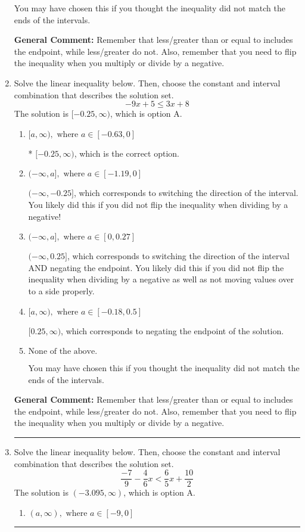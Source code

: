 \documentclass{extbook}[14pt]
\newcommand{\litem}[1]{\item #1

\rule{\textwidth}{0.4pt}}
\begin{document}
\begin{enumerate}
{\begin{enumerate}[label=\Alph*.]
You may have chosen this if you thought the inequality did not match the ends of the intervals.
\end{enumerate}

\textbf{General Comment:} Remember that less/greater than or equal to includes the endpoint, while less/greater do not. Also, remember that you need to flip the inequality when you multiply or divide by a negative.
}
\litem{
Solve the linear inequality below. Then, choose the constant and interval combination that describes the solution set.
\[ -9x + 5 \leq 3x + 8 \]The solution is \( [-0.25, \infty) \), which is option A.\begin{enumerate}[label=\Alph*.]
\item \( [a, \infty), \text{ where } a \in [-0.63, 0] \)

* $[-0.25, \infty)$, which is the correct option.
\item \( (-\infty, a], \text{ where } a \in [-1.19, 0] \)

 $(-\infty, -0.25]$, which corresponds to switching the direction of the interval. You likely did this if you did not flip the inequality when dividing by a negative!
\item \( (-\infty, a], \text{ where } a \in [0, 0.27] \)

 $(-\infty, 0.25]$, which corresponds to switching the direction of the interval AND negating the endpoint. You likely did this if you did not flip the inequality when dividing by a negative as well as not moving values over to a side properly.
\item \( [a, \infty), \text{ where } a \in [-0.18, 0.5] \)

 $[0.25, \infty)$, which corresponds to negating the endpoint of the solution.
\item \( \text{None of the above}. \)

You may have chosen this if you thought the inequality did not match the ends of the intervals.
\end{enumerate}

\textbf{General Comment:} Remember that less/greater than or equal to includes the endpoint, while less/greater do not. Also, remember that you need to flip the inequality when you multiply or divide by a negative.
}
\litem{
Solve the linear inequality below. Then, choose the constant and interval combination that describes the solution set.
\[ \frac{-7}{9} - \frac{4}{6} x < \frac{6}{5} x + \frac{10}{2} \]The solution is \( (-3.095, \infty) \), which is option A.\begin{enumerate}[label=\Alph*.]
\item \( (a, \infty), \text{ where } a \in [-9, 0] \)


\end{enumerate}}
\end{enumerate}
\end{document}
